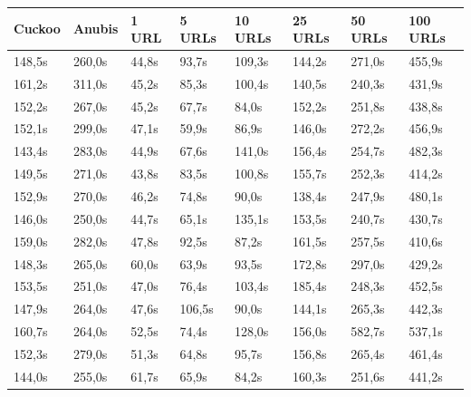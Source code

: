 \documentclass{scrartcl}
\begin{document}

\begin{table}[h]
\begin{tabular}{@{}llllllll@{}}
\toprule
Cuckoo  & Anubis  & 1 URL       & 5 URLs      & 10 URLs      & 25 URLs      & 50 URLs      & 100 URLs     \\ \midrule
148,5s  & 260,0s  & 44,8s       & 93,7s       & 109,3s       & 144,2s       & 271,0s       & 455,9s        \\
161,2s  & 311,0s  & 45,2s       & 85,3s       & 100,4s       & 140,5s       & 240,3s       & 431,9s        \\
152,2s  & 267,0s  & 45,2s       & 67,7s       & 84,0s        & 152,2s       & 251,8s       & 438,8s        \\
152,1s  & 299,0s  & 47,1s       & 59,9s       & 86,9s        & 146,0s       & 272,2s       & 456,9s        \\
143,4s  & 283,0s  & 44,9s       & 67,6s       & 141,0s       & 156,4s       & 254,7s       & 482,3s        \\
149,5s  & 271,0s  & 43,8s       & 83,5s       & 100,8s       & 155,7s       & 252,3s       & 414,2s        \\
152,9s  & 270,0s  & 46,2s       & 74,8s       & 90,0s        & 138,4s       & 247,9s       & 480,1s        \\
146,0s  & 250,0s  & 44,7s       & 65,1s       & 135,1s       & 153,5s       & 240,7s       & 430,7s        \\
159,0s  & 282,0s  & 47,8s       & 92,5s       & 87,2s        & 161,5s       & 257,5s       & 410,6s        \\
148,3s  & 265,0s  & 60,0s       & 63,9s       & 93,5s        & 172,8s       & 297,0s       & 429,2s        \\
153,5s  & 251,0s  & 47,0s       & 76,4s       & 103,4s       & 185,4s       & 248,3s       & 452,5s        \\
147,9s  & 264,0s  & 47,6s       & 106,5s      & 90,0s        & 144,1s       & 265,3s       & 442,3s        \\
160,7s  & 264,0s  & 52,5s       & 74,4s       & 128,0s       & 156,0s       & 582,7s       & 537,1s        \\
152,3s  & 279,0s  & 51,3s       & 64,8s       & 95,7s        & 156,8s       & 265,4s       & 461,4s        \\
144,0s  & 255,0s  & 61,7s       & 65,9s       & 84,2s        & 160,3s       & 251,6s       & 441,2s        \\

\end{tabular}
\end{table}
\end{document}
